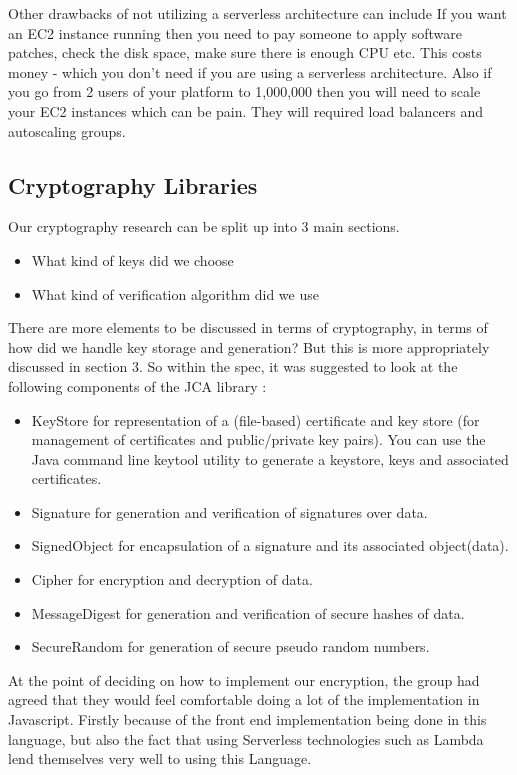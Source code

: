 \documentclass[runningheads]{llncs}
\begin{document}
Other drawbacks of not utilizing a serverless architecture can include If you want an EC2 instance running then you need to pay someone to apply software patches, check the disk space, make sure there is enough CPU  etc. This costs money - which you don't need if you are using a serverless architecture. Also if you go from 2 users of your platform to 1,000,000 then you will need to scale your EC2 instances which can be pain.  They will required load balancers and autoscaling groups.

\subsection{Cryptography Libraries}
Our cryptography research can be split up into 3 main sections.
\begin{itemize}
	\item What kind of keys did we choose
	\item What kind of verification algorithm did we use
\end{itemize}
There are more elements to be discussed in terms of cryptography, in terms of how did we handle key storage and generation? But this is more appropriately discussed in section 3. So within the spec, it was suggested to look at the following components of the JCA library :
\begin{itemize}
	\item KeyStore for representation of a (file-based) certificate and key store (for management of certificates and public/private key pairs). You can use the Java command line keytool utility to generate a keystore, keys and associated certificates.
	\item Signature for generation and verification of signatures over data.
	\item SignedObject for encapsulation of a signature and its associated object(data).
	\item Cipher for encryption and decryption of data.
	\item MessageDigest for generation and verification of secure hashes of data.
	\item SecureRandom for generation of secure pseudo random numbers.
\end{itemize} 
At the point of deciding on how to implement our encryption, the group had agreed that they would feel comfortable doing a lot of the implementation in Javascript. Firstly because of the front end implementation being done in this language, but also the fact that using Serverless technologies such as Lambda lend themselves very well to using this Language. 
\end{document}
